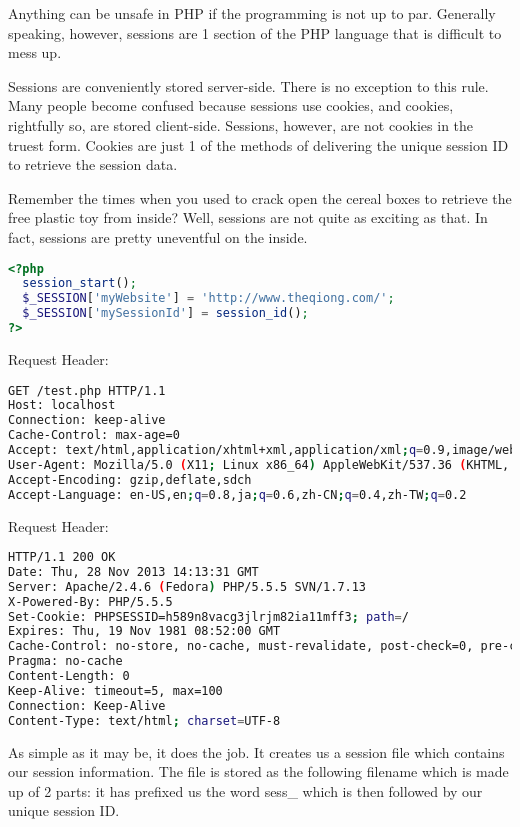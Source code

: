 Anything can be unsafe in PHP if the programming is not up to par. Generally speaking, however, sessions are 1 section of the PHP language that is difficult to mess up.

Sessions are conveniently stored server-side. There is no exception to this rule. Many people become confused because sessions use cookies, and cookies, rightfully so, are stored client-side. Sessions, however, are not cookies in the truest form. Cookies are just 1 of the methods of delivering the unique session ID to retrieve the session data.

Remember the times when you used to crack open the cereal boxes to retrieve the free plastic toy from inside? Well, sessions are not quite as exciting as that. In fact, sessions are pretty uneventful on the inside.

\begin{lstlisting}[language=PHP]
<?php
  session_start();
  $_SESSION['myWebsite'] = 'http://www.theqiong.com/';
  $_SESSION['mySessionId'] = session_id();
?>
\end{lstlisting}

Request Header:

\begin{lstlisting}[language=bash]
GET /test.php HTTP/1.1
Host: localhost
Connection: keep-alive
Cache-Control: max-age=0
Accept: text/html,application/xhtml+xml,application/xml;q=0.9,image/webp,*/*;q=0.8
User-Agent: Mozilla/5.0 (X11; Linux x86_64) AppleWebKit/537.36 (KHTML, like Gecko) Chrome/31.0.1650.57 Safari/537.36
Accept-Encoding: gzip,deflate,sdch
Accept-Language: en-US,en;q=0.8,ja;q=0.6,zh-CN;q=0.4,zh-TW;q=0.2
\end{lstlisting}

Request Header:

\begin{lstlisting}[language=bash]
HTTP/1.1 200 OK
Date: Thu, 28 Nov 2013 14:13:31 GMT
Server: Apache/2.4.6 (Fedora) PHP/5.5.5 SVN/1.7.13
X-Powered-By: PHP/5.5.5
Set-Cookie: PHPSESSID=h589n8vacg3jlrjm82ia11mff3; path=/
Expires: Thu, 19 Nov 1981 08:52:00 GMT
Cache-Control: no-store, no-cache, must-revalidate, post-check=0, pre-check=0
Pragma: no-cache
Content-Length: 0
Keep-Alive: timeout=5, max=100
Connection: Keep-Alive
Content-Type: text/html; charset=UTF-8
\end{lstlisting}

As simple as it may be, it does the job. It creates us a session file which contains our session information. The file is stored as the following filename which is made up of 2 parts: it has prefixed us the word sess\_ which is then followed by our unique session ID.

